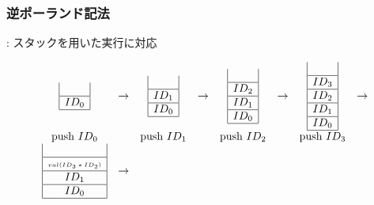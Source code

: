 \documentclass[dvipdfmx]{beamer}
\begin{document}
\begin{frame}
  \frametitle{逆ポーランド記法}
  :
  スタックを用いた実行に対応

  \[
    \begin{array}{cccccccc}
      \begin{array}{|c|}
        \    \\\hline
        ID_0 \\\hline
      \end{array}
                                     & \rightarrow &
      \begin{array}{|c|}
        \    \\\hline
        ID_1 \\\hline
        ID_0 \\\hline
      \end{array}
                                     & \rightarrow &
      \begin{array}{|c|}
        \    \\\hline
        ID_2 \\\hline
        ID_1 \\\hline
        ID_0 \\\hline
      \end{array}
                                     & \rightarrow &
      \begin{array}{|c|}
        \    \\\hline
        ID_3 \\\hline
        ID_2 \\\hline
        ID_1 \\\hline
        ID_0 \\\hline
      \end{array}
                                     & \rightarrow
      \\
      \mbox{push $ID_0$}             &             &
      \mbox{push $ID_1$}             &             &
      \mbox{push $ID_2$}             &             &
      \mbox{push $ID_3$}                             \\
      \begin{array}{|c|}
        \                      \\\hline
        \mbox{\tiny $val(ID_3*ID_2)$} \\\hline
        ID_1                   \\\hline
        ID_0                   \\\hline
      \end{array}
                                     & \rightarrow &

\end{array}\]
\end{frame}
\end{document}
